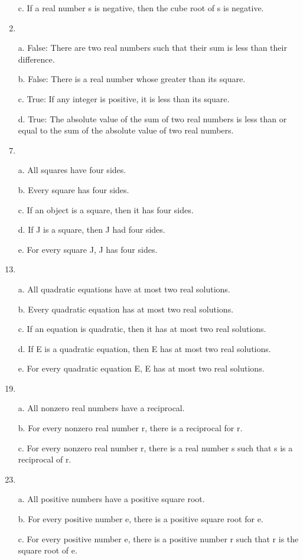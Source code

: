 \documentclass{article}
\begin{document}
\begin{enumerate}[label=\textbf{\arabic*.}]
\item[c.] If a real number s is negative, then the cube root of s is negative.
\item %
\item[a.] False: There are two real numbers such that their sum is less than their difference.
\item[b.] False: There is a real number whose greater than its square.
\item[c.] True: If any integer is positive, it is less than its square.
\item[d.] True: The absolute value of the sum of two real numbers is less than or equal to the sum of the absolute value of two real numbers.
\item %
\item[a.] All squares have four sides.
\item[b.] Every square has four sides.
\item[c.] If an object is a square, then it has four sides.
\item[d.] If J is a square, then J had four sides.
\item[e.] For every square J, J has four sides.
\item %
\item[a.] All quadratic equations have at most two real solutions.
\item[b.] Every quadratic equation has at most two real solutions.
\item[c.] If an equation is quadratic, then it has at most two real solutions.
\item[d.] If E is a quadratic equation, then E has at most two real solutions.
\item[e.] For every quadratic equation E, E has at most two real solutions.
\item %
\item[a.] All nonzero real numbers have a reciprocal.
\item[b.] For every nonzero real number r, there is a reciprocal for r.
\item[c.]  For every nonzero real number r, there is a real number s such that s is a reciprocal of r.
\item %
\item[a.] All positive numbers have a positive square root.
\item[b.] For every positive number e, there is a positive square root for e.
\item[c.] For every positive number e, there is a positive number r such that r is the square root of e.

\end{enumerate}
\end{document}
